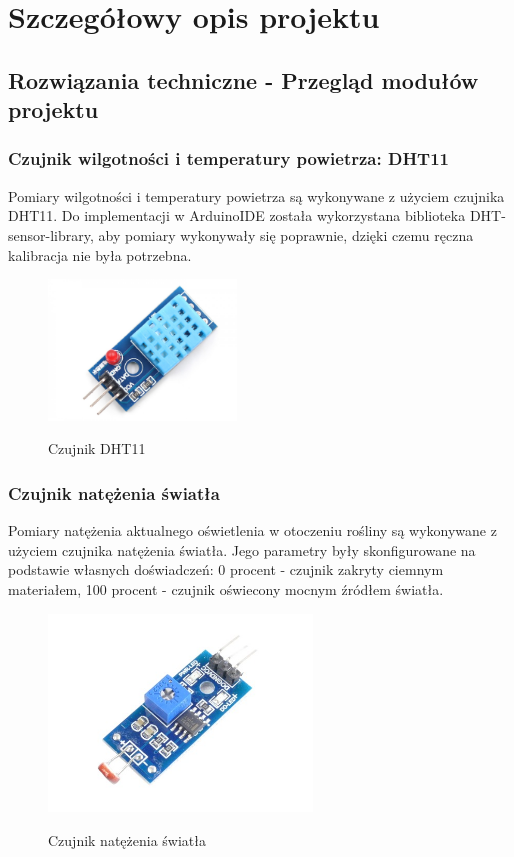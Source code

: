 \documentclass[12pt]{article}
\begin{document}
\section{Szczegółowy opis projektu}


\subsection{Rozwiązania techniczne - Przegląd modułów projektu}
\subsubsection{Czujnik wilgotności i temperatury powietrza: DHT11}
Pomiary wilgotności i temperatury powietrza są wykonywane z użyciem czujnika DHT11. Do implementacji w ArduinoIDE została wykorzystana biblioteka DHT-sensor-library, aby pomiary wykonywały się poprawnie, dzięki czemu ręczna kalibracja nie była potrzebna.
\begin{figure}[!h]
	\begin{center}
		{\includegraphics[width=5cm]{DHT11_photo.png}}
	\end{center}
	\caption{Czujnik DHT11}
\end{figure}


\newpage
\subsubsection{Czujnik natężenia światła}
Pomiary natężenia aktualnego oświetlenia w otoczeniu rośliny są wykonywane z użyciem czujnika natężenia światła. Jego parametry były skonfigurowane na podstawie własnych doświadczeń: 0 procent - czujnik zakryty ciemnym materiałem, 100 procent - czujnik oświecony mocnym źródłem światła.
\begin{figure}[!h]
	\begin{center}
		{\includegraphics[width=7cm]{light_sensor_photo.png}}
	\end{center}
	\caption{Czujnik natężenia światła}
\end{figure}
\end{document}
